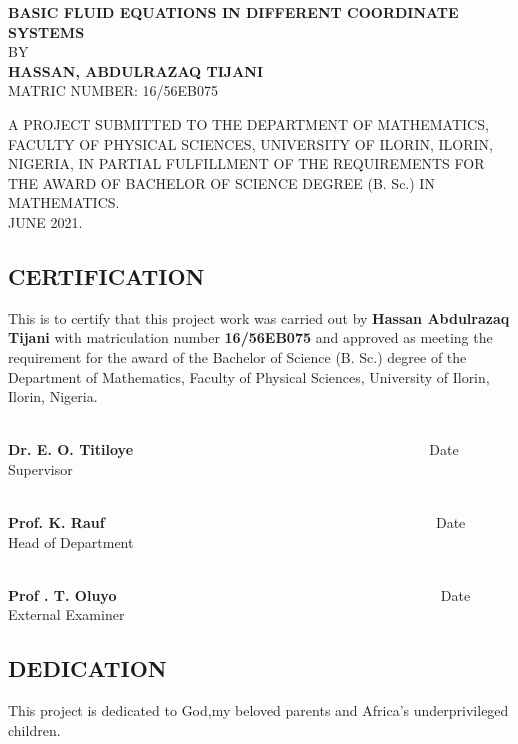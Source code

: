 \documentclass[a4paper, 12pt]{report}
\begin{document}
\begin{titlepage}
\begin{center}
\textbf{\large {BASIC FLUID EQUATIONS IN DIFFERENT COORDINATE SYSTEMS}}
\\[35pt]
BY
\\[20pt]
\textbf{HASSAN, ABDULRAZAQ TIJANI }
\\[20pt]
MATRIC NUMBER: 16/56EB075

\vspace{2cm}
A PROJECT SUBMITTED TO THE DEPARTMENT OF MATHEMATICS, FACULTY OF PHYSICAL SCIENCES, UNIVERSITY OF ILORIN, ILORIN, NIGERIA, IN PARTIAL FULFILLMENT OF THE REQUIREMENTS FOR THE AWARD OF BACHELOR OF SCIENCE DEGREE (B. Sc.) IN MATHEMATICS.
\\[35pt]
JUNE 2021.
\end{center}
\end{titlepage}

\newpage
\begin{center}\section*{CERTIFICATION}\end{center}
This is to certify that this project work was carried out by \textbf{Hassan Abdulrazaq Tijani} with matriculation number \textbf{16/56EB075} and approved as meeting the requirement for the award of the Bachelor of Science (B. Sc.) degree of the Department of Mathematics, Faculty of Physical Sciences, University of Ilorin, Ilorin, Nigeria.

\vspace{.99in}
\noindent
\dotfill			\hfill			\dotfill\\
\textbf{Dr. E. O. Titiloye} ~~~~~~~~~~~~~~~~~~~~~~~~~~~~~~~~~~~~~~~~~ 
Date\\
Supervisor

\vspace{.99in}
\noindent
\dotfill			\hfill			\dotfill\\
\textbf{Prof. K. Rauf} ~~~~~~~~~~~~~~~~~~~~~~~~~~~~~~~~~~~~~~~~~~~~~~ Date\\
Head of Department

\vspace{.99in}
\noindent
\dotfill			\hfill			\dotfill\\
\textbf{Prof . T. Oluyo} ~~~~~~~~~~~~~~~~~~~~~~~~~~~~~~~~~~~~~~~~~~~~~ Date\\
External Examiner
\newpage
\begin{center}\section*{DEDICATION}
This project is dedicated to God,my beloved parents and Africa's underprivileged children.%
\end{center}
\end{document}
